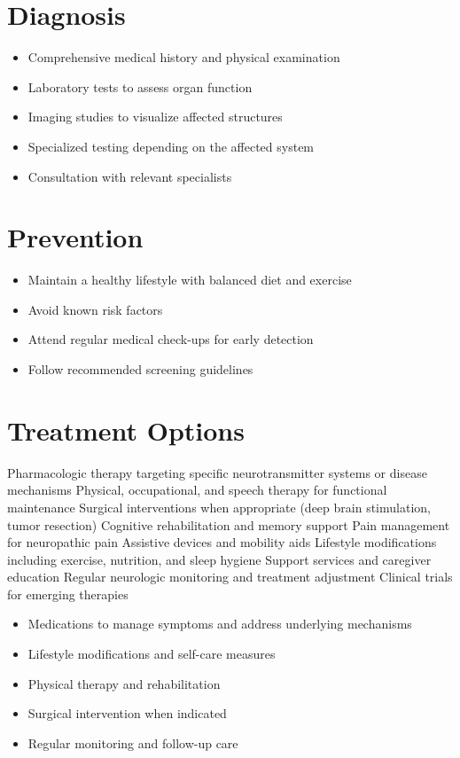 \section{Diagnosis}
\begin{itemize}[noitemsep]
  \item Comprehensive medical history and physical examination
  \item Laboratory tests to assess organ function
  \item Imaging studies to visualize affected structures
  \item Specialized testing depending on the affected system
  \item Consultation with relevant specialists
\end{itemize}
\section{Prevention}
\begin{itemize}[noitemsep]
  \item Maintain a healthy lifestyle with balanced diet and exercise
  \item Avoid known risk factors
  \item Attend regular medical check-ups for early detection
  \item Follow recommended screening guidelines
\end{itemize}
\section{Treatment Options}
Pharmacologic therapy targeting specific neurotransmitter systems or disease mechanisms Physical, occupational, and speech therapy for functional maintenance Surgical interventions when appropriate (deep brain stimulation, tumor resection) Cognitive rehabilitation and memory support Pain management for neuropathic pain Assistive devices and mobility aids Lifestyle modifications including exercise, nutrition, and sleep hygiene Support services and caregiver education Regular neurologic monitoring and treatment adjustment Clinical trials for emerging therapies

\begin{itemize}[noitemsep]
  \item Medications to manage symptoms and address underlying mechanisms
  \item Lifestyle modifications and self-care measures
  \item Physical therapy and rehabilitation
  \item Surgical intervention when indicated
  \item Regular monitoring and follow-up care
\end{itemize}
